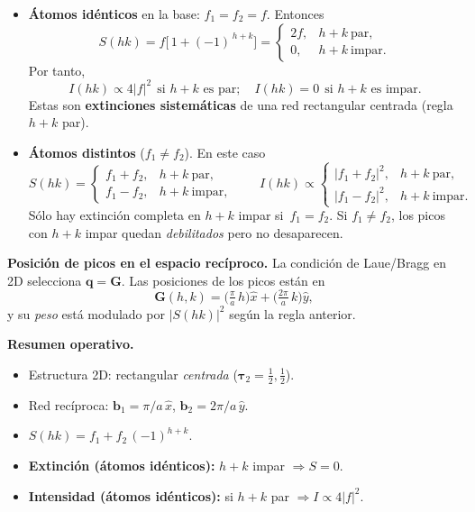 \documentclass{article}
\begin{document}
\begin{itemize}
\item \textbf{Átomos idénticos} en la base: \(f_1=f_2=f\).  
Entonces
\[
S(hk)= f\big[\,1+(-1)^{\,h+k}\big] 
=
\begin{cases}
2f, & h+k \ \text{par},\\
0,  & h+k \ \text{impar}.
\end{cases}
\]
Por tanto,
\[
\boxed{\,I(hk)\propto 4|f|^2 \ \ \text{si } h+k \text{ es par}; \quad I(hk)=0 \ \ \text{si } h+k \text{ es impar.}\,}
\]
Estas son \textbf{extinciones sistemáticas} de una red rectangular centrada (regla \(h{+}k\) par).

\item \textbf{Átomos distintos} (\(f_1\neq f_2\)).  
En este caso
\[
S(hk)=
\begin{cases}
f_1+f_2, & h+k\ \text{par},\\
f_1-f_2, & h+k\ \text{impar},
\end{cases}
\qquad
I(hk)\propto 
\begin{cases}
|f_1+f_2|^2, & h+k\ \text{par},\\
|f_1-f_2|^2, & h+k\ \text{impar}.
\end{cases}
\]
Sólo hay extinción completa en \(h{+}k\) impar si \(\,f_1=f_2\). Si \(f_1\neq f_2\), los picos con \(h{+}k\) impar quedan \emph{debilitados} pero no desaparecen.
\end{itemize}

\medskip
\textbf{Posición de picos en el espacio recíproco.}  
La condición de Laue/Bragg en 2D selecciona \(\mathbf{q}=\mathbf{G}\). Las posiciones de los picos están en
\[
\mathbf{G}(h,k)=\Big(\tfrac{\pi}{a}\,h\Big)\hat{x} + \Big(\tfrac{2\pi}{a}\,k\Big)\hat{y},
\]
y su \emph{peso} está modulado por \(|S(hk)|^2\) según la regla anterior.

\medskip
\textbf{Resumen operativo.}
\begin{itemize}
\item Estructura 2D: rectangular \emph{centrada} (\(\boldsymbol{\tau}_2=\tfrac12,\tfrac12\)).
\item Red recíproca: \(\mathbf{b}_1=\pi/a\,\hat{x}\), \(\mathbf{b}_2=2\pi/a\,\hat{y}\).
\item \(\displaystyle S(hk)=f_1+f_2\,(-1)^{h+k}\).
\item \textbf{Extinción (átomos idénticos):} \(h{+}k\) impar \(\Rightarrow S=0\).  
\item \textbf{Intensidad (átomos idénticos):} si \(h{+}k\) par \(\Rightarrow I\propto 4|f|^2\).
\end{itemize}
\end{document}

